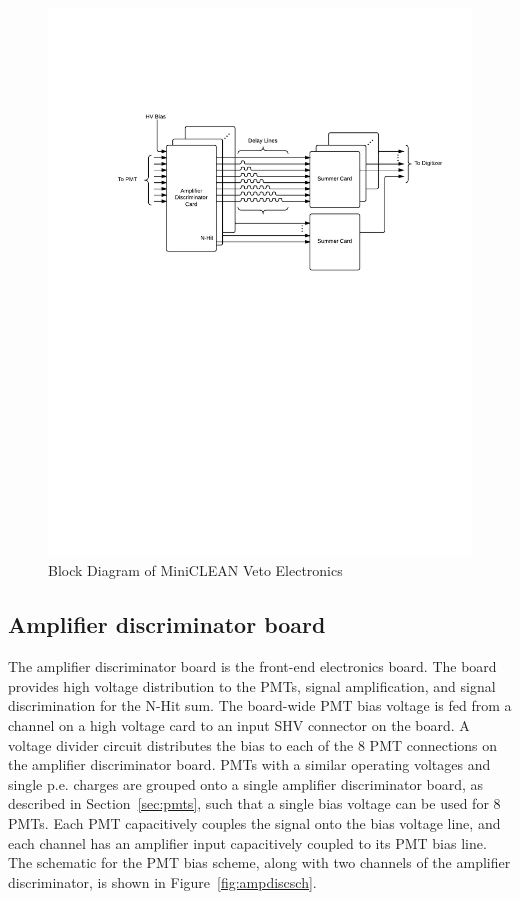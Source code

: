 \documentclass[review,number,sort&compress]{elsarticle}
\begin{document}
\begin{figure}[ht]
\begin{center}
\includegraphics[width=5in, keepaspectratio=true, trim=1.25in 5.75in 0.5in 2in, clip=true]{graphics/block.pdf}
\caption{Block Diagram of MiniCLEAN Veto Electronics
\label{fig:block_diagram}}
\end{center}
\end{figure}

\subsection{Amplifier discriminator board}
\label{sec:Amp-Disc}
%
The amplifier discriminator board is the front-end electronics board.
The board provides high voltage distribution to the PMTs, signal
amplification, and signal discrimination for the N-Hit sum. The
board-wide PMT bias voltage is fed from a channel on a high voltage card
to an input SHV connector on the board. A voltage divider circuit distributes the bias to
each of the 8 PMT connections on the amplifier discriminator board.
PMTs with a similar operating voltages and single p.e. charges are
grouped onto a single amplifier discriminator board, as described in
Section~\ref{sec:pmts}, such that a single bias voltage can be used for
8 PMTs. Each PMT capacitively couples the signal onto the bias voltage
line, and each channel has an amplifier input capacitively coupled to
its PMT bias line. The schematic for the PMT bias scheme, along with
two channels of the amplifier discriminator, is shown in
Figure~\ref{fig:ampdiscsch}.
\end{document}
